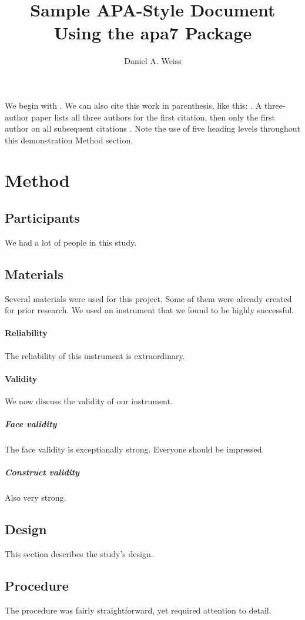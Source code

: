 \documentclass[jou]{apa7}
\title{Sample APA-Style Document Using the \textsf{apa7} Package}
\author{Daniel A. Weiss}
\affiliation{A University Somewhere}
\begin{document}
\maketitle
We begin with \textcite{Shotton1989}. We can also cite this work in
parenthesis, like this: \parencite{Shotton1989}.
A three-author paper \parencite[e.g.,][]{Lassen2006} lists all
three authors for the first citation, then only the first author
on all subsequent citations \parencite{Lassen2006}.
Note the use of five heading levels throughout this demonstration
Method section.
\section{Method}
\subsection{Participants}
We had a lot of people in this study.
\subsection{Materials}
Several materials were used for this project. Some of them were
already created for prior research.
We used an instrument that we found to be highly successful.
\paragraph{Reliability}
The reliability of this instrument is extraordinary.
\paragraph{Validity}
We now discuss the validity of our instrument.
\subparagraph{Face validity} The face validity is exceptionally
strong. Everyone should be impressed.
\subparagraph{Construct validity} Also very strong.
\subsection{Design}
This section describes the study’s design.
\subsection{Procedure}
The procedure was fairly straightforward, yet required
attention to detail.
\end{document}
